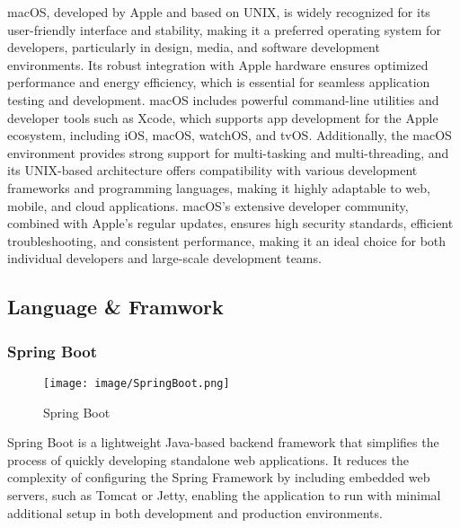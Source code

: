 \documentclass[conference]{IEEEtran}
\begin{document}
\noindent macOS, developed by Apple and based on UNIX, is widely recognized for its user-friendly interface and stability, making it a preferred operating system for developers, particularly in design, media, and software development environments. Its robust integration with Apple hardware ensures optimized performance and energy efficiency, which is essential for seamless application testing and development. macOS includes powerful command-line utilities and developer tools such as Xcode, which supports app development for the Apple ecosystem, including iOS, macOS, watchOS, and tvOS. Additionally, the macOS environment provides strong support for multi-tasking and multi-threading, and its UNIX-based architecture offers compatibility with various development frameworks and programming languages, making it highly adaptable to web, mobile, and cloud applications. macOS’s extensive developer community, combined with Apple’s regular updates, ensures high security standards, efficient troubleshooting, and consistent performance, making it an ideal choice for both individual developers and large-scale development teams. \\

\clearpage

\subsection{Language \& Framwork}

\subsubsection{Spring Boot}

\begin{figure}[h!]
    \centering
    \texttt{[image: image/SpringBoot.png]}
    \caption{Spring Boot}
    \label{fig:enter-label}
\end{figure}

\noindent Spring Boot is a lightweight Java-based backend framework that simplifies the process of quickly developing standalone web applications. It reduces the complexity of configuring the Spring Framework by including embedded web servers, such as Tomcat or Jetty, enabling the application to run with minimal additional setup in both development and production environments.\\
\end{document}
